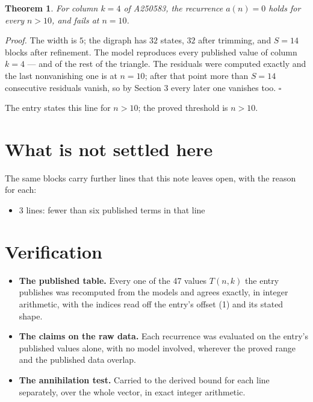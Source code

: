 \documentclass[11pt]{article}
\newtheorem{theorem}{Theorem}
\theoremstyle{definition}
\begin{document}
\begin{theorem} For column $k = 4$ of A250583, the recurrence $a(n) = 0$ holds for every $n > 10$, and fails at $n = 10$.\end{theorem}

{\itshape Proof.} The width is $5$; the digraph has $32$ states, $32$ after trimming, and $S = 14$ blocks after refinement. The model reproduces every published value of column $k = 4$ --- and of the rest of the triangle. The residuals were computed exactly and the last nonvanishing one is at $n = 10$; after that point more than $S = 14$ consecutive residuals vanish, so by Section 3 every later one vanishes too. $\square$

The entry states this line for $n > 10$; the proved threshold is $n > 10$.

\section{What is not settled here}

The same blocks carry further lines that this note leaves open, with the reason for each:

\begin{itemize}

\item 3 lines: fewer than six published terms in that line

\end{itemize}

\section{Verification}

\begin{itemize}

\item {\bfseries The published table.} Every one of the 47 values $T(n,k)$ the entry publishes was recomputed from the models and agrees exactly, in integer arithmetic, with the indices read off the entry's offset (1) and its stated shape.

\item {\bfseries The claims on the raw data.} Each recurrence was evaluated on the entry's published values alone, with no model involved, wherever the proved range and the published data overlap.

\item {\bfseries The annihilation test.} Carried to the derived bound for each line separately, over the whole vector, in exact integer arithmetic.

\end{itemize}
\end{document}
